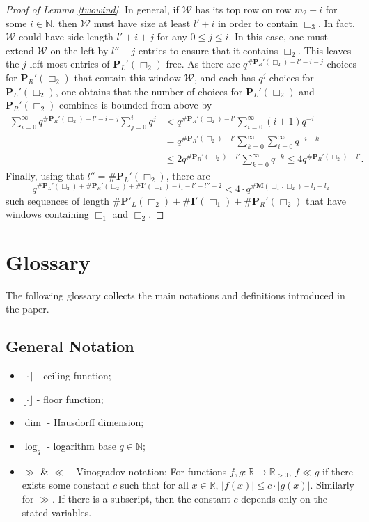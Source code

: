 \documentclass{article}
\theoremstyle{definition}
\newcommand{\N}{\mathbb{N}}
\newcommand{\R}{\mathbb{R}}
\numberwithin{equation}{subsection}
\begin{document}
\begin{proof}[Proof of Lemma \ref{twowind}]
\noindent In general, if $\mathcal{W}$ has its top row on row $m_2-i$ for some $i\in\N$, then $\mathcal{W}$ must have size at least $l'+i$ in order to contain $\Box_3$. In fact, $\mathcal{W}$ could have side length $l'+i+j$ for any $0\le j \le i$. In this case, one must extend $\mathcal{W}$ on the left by $l''-j$ entries to ensure that it contains $\Box_2$. This leaves the $j$ left-most entries of $\mathbf{P}_L'(\Box_2)$ free. As there are $q^{\#\mathbf{P}_R'(\Box_2)-l'-i-j}$ choices for $\mathbf{P}_R'(\Box_2)$ that contain this window $\mathcal{W}$, and each has $q^j$ choices for $\mathbf{P}_L'(\Box_2)$, one obtains that the number of choices for $\mathbf{P}_L'(\Box_2)$ and $\mathbf{P}_R'(\Box_2)$ combines is bounded from above by \begin{align*}
    \sum_{i=0}^\infty q^{\#\mathbf{P}_R'(\Box_2)-l'-i-j}\sum_{j=0}^i q^j &< q^{\#\mathbf{P}_R'(\Box_2) -l'}\sum_{i=0}^\infty (i+1)q^{ - i}\\&=q^{\#\mathbf{P}_R'(\Box_2) -l'}\sum_{k=0}^\infty \sum_{i=0}^\infty q^{-i-k} \\
 &\le 2q^{\#\mathbf{P}_R'(\Box_2) -l'} \sum_{k=0}^\infty q^{-k} \le 4q^{\#\mathbf{P}_R'(\Box_2) -l'}.
\end{align*}
\noindent Finally, using that $l''=\#\mathbf{P}_L'(\Box_2)$, there are $$q^{\#\mathbf{P}_L'(\Box_2)+\#\mathbf{P}_R'(\Box_2)+\#\mathbf{I}'(\Box_1)-l_1-l'-l''+2}< 4\cdot q^{\#\mathbf{M}(\Box_1,\Box_2)-l_1-l_2}$$ such sequences of length $\#\mathbf{P}'_L(\Box_2)+\#\mathbf{I}'(\Box_1)+\#\mathbf{P}_R'(\Box_2)$ that have windows containing $\Box_1$ and $\Box_2$. 
\end{proof}




\newpage
{}
\section*{Glossary}
\noindent The following glossary collects the main notations and definitions introduced in the paper. 
\subsection*{General Notation}
\begin{itemize}
    \item $\lceil\cdot\rceil$ - ceiling function;
    \item $\lfloor\cdot\rfloor$ - floor function;
    \item $\dim$ - Hausdorff dimension;
    \item $\log_q$ - logarithm base $q\in\N$;
    \item $\gg$ \& $\ll$ - Vinogradov notation: For functions $f,g:\R\to\R_{>0}$, $f\ll g$ if there exists some constant $c$ such that for all $x\in\R$, $|f(x)|\le c\cdot |g(x)|$. Similarly for $\gg$. If there is a subscript, then the constant $c$ depends only on the stated variables.
\end{itemize}
\end{document}
